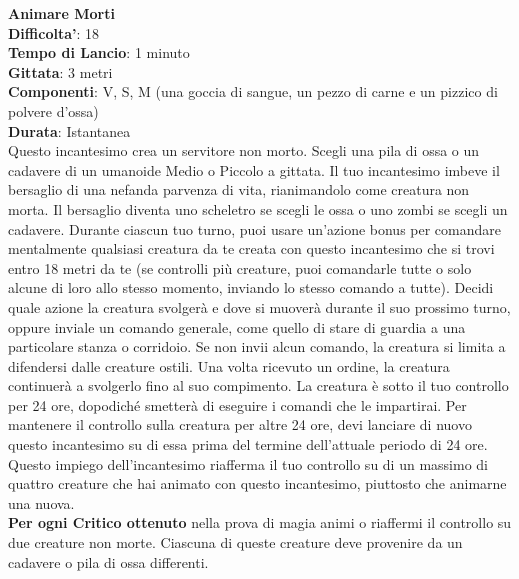 \begin{multicols}{2}
\medskip\textbf{Animare Morti}\\
\textbf{Difficolta'}: 18\\
\textbf{Tempo di Lancio}: 1 minuto\\
\textbf{Gittata}: 3 metri\\
\textbf{Componenti}: V, S, M (una goccia di sangue, un pezzo di carne e un pizzico di polvere d’ossa)\\
\textbf{Durata}: Istantanea\\
Questo incantesimo crea un servitore non morto. Scegli una pila di ossa o un cadavere di un umanoide Medio o Piccolo a gittata. Il tuo incantesimo imbeve il bersaglio di una nefanda parvenza di vita, rianimandolo come creatura non morta. Il bersaglio diventa uno scheletro se scegli le ossa o uno zombi se scegli un cadavere. Durante ciascun tuo turno, puoi usare un’azione bonus per comandare mentalmente qualsiasi creatura da te creata con questo incantesimo che si trovi entro 18 metri da te (se controlli più creature, puoi comandarle tutte o solo alcune di loro allo stesso momento, inviando lo stesso comando a tutte). Decidi quale azione la creatura svolgerà e dove si muoverà durante il suo prossimo turno, oppure inviale un comando generale, come quello di stare di guardia a una particolare stanza o corridoio. Se non invii alcun comando, la creatura si limita a difendersi dalle creature ostili. Una volta ricevuto un ordine, la creatura continuerà a svolgerlo fino al suo compimento. La creatura è sotto il tuo controllo per 24 ore, dopodiché smetterà di eseguire i comandi che le impartirai. Per mantenere il controllo sulla creatura per altre 24 ore, devi lanciare di nuovo questo incantesimo su di essa prima del termine dell’attuale periodo di 24 ore. Questo impiego dell’incantesimo riafferma il tuo controllo su di  un massimo di quattro creature che hai animato con questo incantesimo, piuttosto che animarne una nuova.\\
\textbf{Per ogni Critico ottenuto} nella prova di magia animi o riaffermi il controllo su due creature non morte. Ciascuna di queste creature deve provenire da un cadavere o pila di ossa differenti.


\end{multicols}
